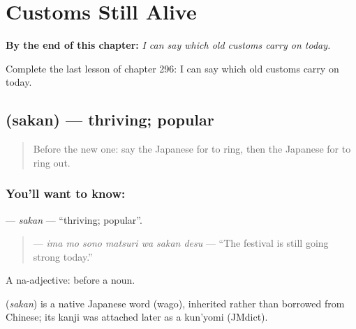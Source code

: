 
\chapter{Customs Still Alive}
\label{ch:ja-customs-still-alive}

\begin{chapteropening}
\textbf{By the end of this chapter:} \emph{I can say which old customs carry on today.}

Complete the last lesson of chapter 296: I can say which old customs carry on today.
\end{chapteropening}

\section[\texorpdfstring{\ja{さかん} (sakan)}{さかん (sakan)}]{ (sakan) — thriving; popular}

\label{lesson:JA-C296-sakan}



\begin{quote}
Before the new one: say the Japanese for to ring, then the Japanese for to ring out.
\end{quote}

\subsection*{You'll want to know: }
\textbf{} — \emph{sakan} — \textquotedblleft{}thriving; popular\textquotedblright{}.

\begin{quote}
\textbf{   } — \emph{ima mo sono matsuri wa sakan desu} — \textquotedblleft{}The festival is still going strong today.\textquotedblright{}
\end{quote}

A na-adjective:  before a noun.

\begin{cousinweb}
\textbf{} (\emph{sakan}) is a native Japanese word (wago), inherited rather than borrowed from Chinese; its kanji was attached later as a kun'yomi (JMdict).
\end{cousinweb}

